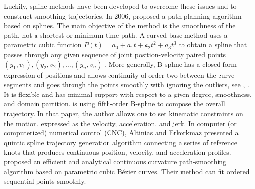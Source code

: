 Luckily, spline methods have been developed to overcome these issues and to construct smoothing trajectories.  In 2006, \cite{magid2006spline} proposed a path planning algorithm based on splines. The main objective of the method is the smoothness of the path, not a shortest or minimum-time path. A curved-base method uses a parametric cubic function $P(t)=a_0+a_1t+a_2t^2+a_3t^3$ to obtain a spline that passes through any given sequence of joint position-velocity paired points $(y_1, v_1), (y_2, v_2), \ldots, (y_n,v_n)$ \cite{yu2004curve}. More generally, B-spline has a closed-form expression of positions and allows continuity of order two between the curve segments and goes through the points smoothly with ignoring the outliers, see \eg \cite{komoriya1989trajectory}, \cite{ben2004geometric}. It is flexible and has minimal support with respect to a given degree, smoothness, and domain partition. \cite{gasparetto2007new} is using fifth-order B-spline to compose the overall trajectory. In that paper, the author allows one to set kinematic constraints on the motion, expressed as the velocity, acceleration, and jerk. In computer (or computerized) numerical control (CNC), Altintas and Erkorkmaz \cite{erkorkmaz2001high} presented a quintic spline trajectory generation algorithm connecting a series of reference knots that produces continuous position, velocity, and acceleration profiles. \cite{yang2010analytical} proposed an efficient and analytical continuous curvature path-smoothing algorithm based on parametric cubic B\'{e}zier curves. Their method can fit ordered sequential points smoothly. 


